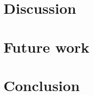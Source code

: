 \documentclass[11pt]{article}
\begin{document}
\section{Discussion}


\section{Future work}


\section{Conclusion}




\onecolumn
\begin{appendices}

\label{values:appendix}

\clearpage

\label{values:appendix}


\end{appendices}
\end{document}
